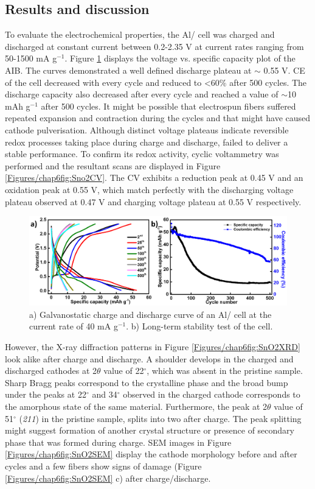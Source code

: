 \subsection{Results and discussion}
To evaluate the electrochemical properties, the Al/ cell was charged and discharged at constant current between 0.2-2.35 V at current rates ranging from 50-1500 mA g$^{-1}$. Figure \ref{Figures/chap6fig:SnO2newCDC} displays the voltage vs. specific capacity plot of the AIB. The curves demonstrated a well defined discharge plateau at $\sim$ 0.55 V. CE of the cell decreased with every cycle and reduced to <60\% after 500 cycles. The discharge capacity also decreased after every cycle and reached a value of $\sim$10 mAh g$^{-1}$ after 500 cycles. It might be possible that electrospun fibers suffered repeated expansion and contraction during the cycles and that might have caused cathode pulverisation. Although distinct voltage plateaus indicate reversible redox processes taking place during charge and discharge,  failed to deliver a stable performance. To confirm its redox activity, cyclic voltammetry was performed and the resultant scans are displayed in Figure \ref{Figures/chap6fig:Sno2CV}. The CV exhibits a reduction peak at 0.45 V and an oxidation peak at 0.55 V, which match perfectly with the discharging voltage plateau observed at 0.47 V and charging voltage plateau at 0.55 V respectively.    
\begin{figure}[th!]
  \centering
  \includegraphics[width=\textwidth]{Figures/chap6fig/SnO2newCDC}
    \caption{a) Galvanostatic charge and discharge curve of an Al/ cell at the current rate of 40 mA g$^{-1}$. b) Long-term stability test of the cell.}
  \label{Figures/chap6fig:SnO2newCDC}
\end{figure}
However, the X-ray diffraction patterns in Figure \ref{Figures/chap6fig:SnO2XRD} look alike after charge and discharge. A shoulder develops in the charged and discharged cathodes at 2$\theta$ value of 22$^{\circ}$, which was absent in the pristine sample. Sharp Bragg peaks correspond to the crystalline phase and the broad bump under the peaks at 22$^{\circ}$ and  34$^{\circ}$ observed in the charged cathode corresponds to the amorphous state of the same material. Furthermore, the peak at 2$\theta$ value of 51$^{\circ}$ (\textit{211}) in the pristine sample, splits into two after charge. The peak splitting might suggest formation of another crystal structure or presence of secondary phase that was formed during charge. SEM images in Figure \ref{Figures/chap6fig:SnO2SEM} display the cathode morphology before and after cycles and a few fibers show signs of damage (Figure \ref{Figures/chap6fig:SnO2SEM} c) after charge/discharge. 

